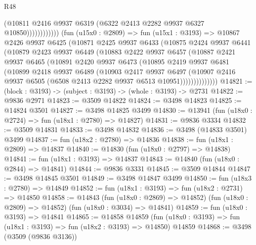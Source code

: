 \begin{lexlean}{R48}
\begin{coremodule}
                            (@10811
                              @2416
                              @9937
                              @6319
                              (@6322 @2413 @2282 @9937 @6327 @10850))))))))))))
        (fun (u15x0 : @2809) =>
        fun (u15x1 : @3193) =>
        @10867
          @2426
          @9937
          @6425
          (@10871
            @2425
            @9937
            @6433
            (@10875
              @2424
              @9937
              @6441
              (@10879
                @2423
                @9937
                @6449
                (@10883
                  @2422
                  @9937
                  @6457
                  (@10887
                    @2421
                    @9937
                    @6465
                    (@10891
                      @2420
                      @9937
                      @6473
                      (@10895
                        @2419
                        @9937
                        @6481
                        (@10899
                          @2418
                          @9937
                          @6489
                          (@10903
                            @2417
                            @9937
                            @6497
                            (@10907
                              @2416
                              @9937
                              @6505
                              (@6508 @2413 @2282 @9937 @6513 @10951))))))))))))))
@14821 := (block : @3193) -> (subject : @3193) -> (whole : @3193) -> @2731
@14822 := @9836 @2971
@14823 := @3509 @14822
@14824 := @3498 @14823
@14825 := @14824 @3501
@14827 := @3498 @14825 @3499
@14830 := @13941 (fun (u18x0 : @2724) => fun (u18x1 : @2780) => @14827)
@14831 := @9836 @3334
@14832 := @3509 @14831
@14833 := @3498 @14832
@14836 := @3498 (@14833 @3501) @3499
@14837 := fun (u18x2 : @2780) => @14836
@14838 := fun (u18x1 : @2809) => @14837
@14840 := @14830 (fun (u18x0 : @2797) => @14838)
@14841 := fun (u18x1 : @3193) => @14837
@14843 := @14840 (fun (u18x0 : @2844) => @14841)
@14844 := @9836 @3331
@14845 := @3509 @14844
@14847 := @3498 @14845 @3501
@14849 := @3498 @14847 @3499
@14850 := fun (u18x3 : @2780) => @14849
@14852 := fun (u18x1 : @3193) => fun (u18x2 : @2731) => @14850
@14858 := @14843
    (fun (u18x0 : @2869) => @14852)
    (fun (u18x0 : @2809) => @14852)
    (fun (u18x0 : @3034) => @14841)
@14859 := fun (u18x0 : @3193) => @14841
@14865 := @14858
    @14859
    (fun (u18x0 : @3193) => fun (u18x1 : @3193) => fun (u18x2 : @3193) => @14850)
    @14859
@14868 := @3498 (@3509 (@9836 @3136))

\end{coremodule}
\end{lexlean}
